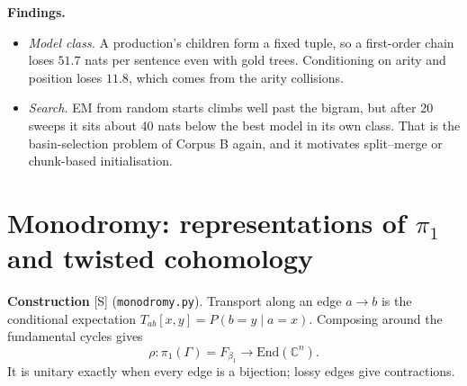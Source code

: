\documentclass[11pt]{article}
\theoremstyle{definition}
\theoremstyle{remark}
\newcommand{\src}[1]{\textsf{\small[#1]}}
\begin{document}
\noindent\textbf{Findings.}
\begin{itemize}
  \item \emph{Model class.} A production's children form a fixed tuple, so a first-order chain loses $51.7$ nats per sentence even with gold trees. Conditioning on arity and position loses $11.8$, which comes from the arity collisions.
  \item \emph{Search.} EM from random starts climbs well past the bigram, but after 20 sweeps it sits about 40 nats below the best model in its own class. That is the basin-selection problem of Corpus B again, and it motivates split--merge or chunk-based initialisation.
\end{itemize}

\section{Monodromy: representations of $\pi_1$ and twisted cohomology}\label{sec:mono}
\textbf{Construction} \src{S} (\texttt{monodromy.py}). Transport along an edge $a\to b$ is the conditional expectation $T_{ab}[x,y]=P(b=y\mid a=x)$. Composing around the fundamental cycles gives
\[
\rho:\pi_1(\Gamma)=F_{\beta_1}\to\mathrm{End}(\mathbb C^n).
\]
It is unitary exactly when every edge is a bijection; lossy edges give contractions.
\end{document}
